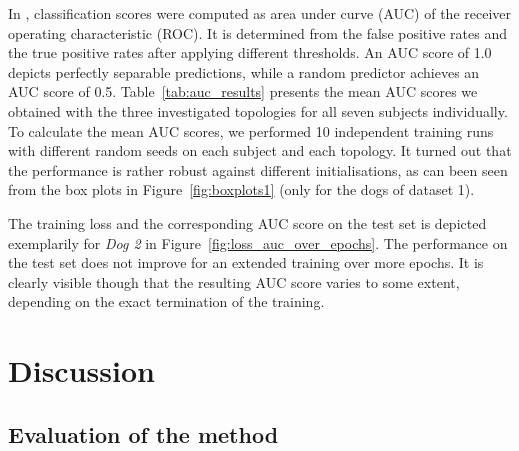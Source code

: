\documentclass[a4paper, conference]{IEEEtran}
\begin{document}
In \cite{Brinkmann2016, Kuhlmann2018}, classification scores were computed as area under curve (AUC) of the receiver operating characteristic (ROC). It is determined from the false positive rates and the true positive rates after applying different thresholds. An AUC score of 1.0 depicts perfectly separable predictions, while a random predictor achieves an AUC score of 0.5.   Table~\ref{tab:auc_results} presents the mean AUC scores we obtained with the three investigated topologies for all seven subjects individually. To calculate the mean AUC scores, we performed 10 independent training runs with different random seeds on each subject and each topology. It turned out that the performance is rather robust against different initialisations, as can been seen from the box plots in Figure~\ref{fig:boxplots1} (only for the dogs of dataset 1).

The training loss and the corresponding AUC score on the test set is depicted exemplarily for \textit{Dog 2} in Figure~\ref{fig:loss_auc_over_epochs}. The performance on the test set does not improve for an extended training over more epochs. It is clearly visible though that the resulting AUC score varies to some extent, depending on the exact termination of the training.

\section{Discussion}
\label{sec:discussion}

\subsection{Evaluation of the method}
\label{subsec:evaluation_of_the_method}
\end{document}
